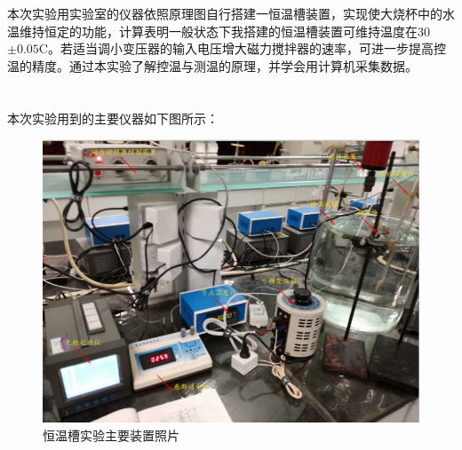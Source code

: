 ﻿\documentclass[10.5pt]{ctexart}
\begin{document}
\title{\textbf{}} %
\author{}
\date{}
\maketitle
\section{\textbf{}}
本次实验用实验室的仪器依照原理图自行搭建一恒温槽装置，实现使大烧杯中的水温维持恒定的功能，计算表明一般状态下我搭建的恒温槽装置可维持温度在30$\pm0.05$\degree C。若适当调小变压器的输入电压增大磁力搅拌器的速率，可进一步提高控温的精度。通过本实验了解控温与测温的原理，并学会用计算机采集数据。
\section{\textbf{}}
\subsection{\textbf{}}
本次实验用到的主要仪器如下图所示：
\begin{figure}[!ht]
\centering
\caption{恒温槽实验主要装置照片}
\includegraphics[width=400pt]{Equipment.png}
\end{figure}
\end{document}
